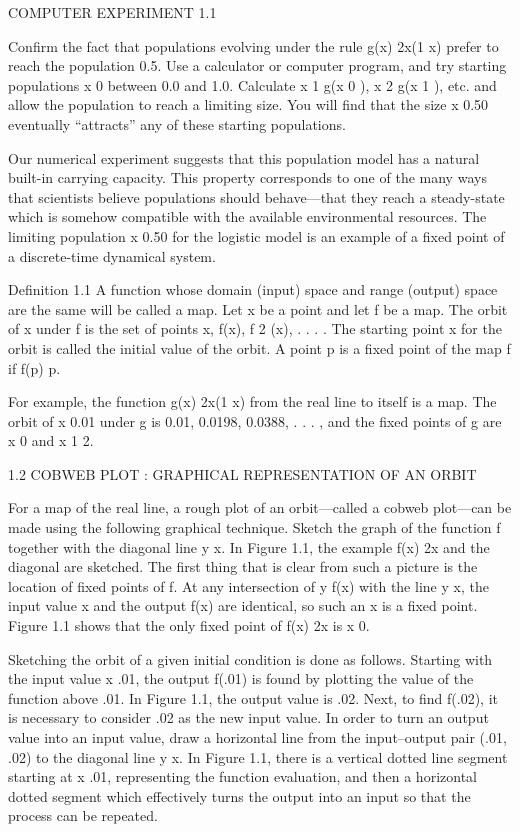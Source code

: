 \documentclass[12pt]{article}
\begin{document}
COMPUTER EXPERIMENT 1.1

Confirm the fact that populations evolving under the rule g(x)  2x(1  x) prefer to reach the population 
0.5. Use a calculator or computer program, and try starting populations x 0 between 0.0 and 1.0. Calculate 
x 1  g(x 0 ), x 2  g(x 1 ), etc. and allow the population to reach a limiting size. You will find that the 
size x  0.50 eventually “attracts” any of these starting populations.

Our numerical experiment suggests that this population model has a natural built-in carrying capacity. This 
property corresponds to one of the many ways that scientists believe populations should behave—that they 
reach a steady-state which is somehow compatible with the available environmental resources. The limiting 
population x  0.50 for the logistic model is an example of a fixed point of a discrete-time dynamical 
system.

Definition 1.1 A function whose domain (input) space and range (output) space are the same will be called a 
map. Let x be a point and let f be a map. The orbit of x under f is the set of points x, f(x), f 2 (x), . . 
.  . The starting point x for the orbit is called the initial value of the orbit. A point p is a fixed 
point of the map f if f(p)  p.

For example, the function g(x)  2x(1  x) from the real line to itself is a map. The orbit of x  0.01 under 
g is 0.01, 0.0198, 0.0388, . . .  , and the fixed points of g are x  0 and x  1  2.

1.2 COBWEB PLOT : GRAPHICAL REPRESENTATION OF AN ORBIT

For a map of the real line, a rough plot of an orbit—called a cobweb plot—can be made using the following 
graphical technique. Sketch the graph of the function f together with the diagonal line y  x. In Figure 
1.1, the example f(x)  2x and the diagonal are sketched. The first thing that is clear from such a picture 
is the location of fixed points of f. At any intersection of y  f(x) with the line y  x,
the input value x and the output f(x) are identical, so such an x is a fixed point. Figure 1.1 shows that 
the only fixed point of f(x)  2x is x  0.

Sketching the orbit of a given initial condition is done as follows. Starting with the input value x  .01, 
the output f(.01) is found by plotting the value of the function above .01. In Figure 1.1, the output value 
is .02. Next, to find f(.02), it is necessary to consider .02 as the new input value. In order to turn an 
output value into an input value, draw a horizontal line from the input–output pair (.01, .02) to the 
diagonal line y  x. In Figure 1.1, there is a vertical dotted line segment starting at x  .01, representing 
the function evaluation, and then a horizontal dotted segment which effectively turns the output into an 
input so that the process can be repeated.
\end{document}
